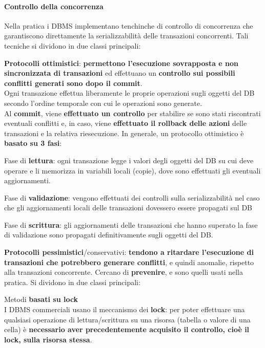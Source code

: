 \documentclass[10pt]{book}
\begin{document}
\paragraph{Controllo della concorrenza} Nella pratica i DBMS implementano tenchinche di controllo di concorrenza che garantiscono direttamente la serializzabilità delle transazioni concorrenti. Tali tecniche si dividono in due classi principali:
\begin{list}{}{}
	\item \textbf{Protocolli ottimistici}: \textbf{permettono l'esecuzione sovrapposta e non sincronizzata di transazioni} ed effettuano un \textbf{controllo sui possibili conflitti generati sono dopo il commit}.\\
	Ogni transazione effettua liberamente le proprie operazioni sugli oggetti del DB secondo l'ordine temporale con cui le operazioni sono generate.\\
	Al \textbf{commit}, viene \textbf{effettuato un controllo} per stabilire se sono stati riscontrati eventuali conflitti e, in caso, viene \textbf{effettuato il rollback delle azioni} delle transazioni e la relativa riesecuzione. In generale, un protocollo ottimistico è \textbf{basato su 3 fasi}:
	\begin{list}{}{}
		\item Fase di \textbf{lettura}: ogni transazione legge i valori degli oggetti del DB su cui deve operare e li memorizza in variabili locali (copie), dove sono effettuati gli eventuali aggiornamenti.
		\item Fase di \textbf{validazione}: vengono effettuati dei controlli sulla serializzabilità nel caso che gli aggiornamenti locali delle transazioni dovessero essere propagati sul DB
		\item Fase di \textbf{scrittura}: gli aggiornamenti delle transazioni che hanno superato la fase di validazione sono propagati definitivamente sugli oggetti del DB.
	\end{list}
	\item \textbf{Protocolli pessimistici}/conservativi: \textbf{tendono a ritardare l'esecuzione di transazioni che potrebbero generare conflitti}, e quindi anomalie, rispetto alla transazioni concorrente. Cercano di \textbf{prevenire}, e sono quelli usati nella pratica. Si dividono in due classi principali:
	\begin{list}{}{}
		\item Metodi \textbf{basati su lock}\\
		I DBMS commerciali usano il meccanismo dei \textbf{lock}: per poter effettuare una qualsiasi operazione di lettura/scrittura su una risorsa (tabella o valore di una cella) è \textbf{necessario aver precedentemente acquisito il controllo, cioè il lock, sulla risorsa stessa}.

\end{list}
\end{list}
\end{document}
